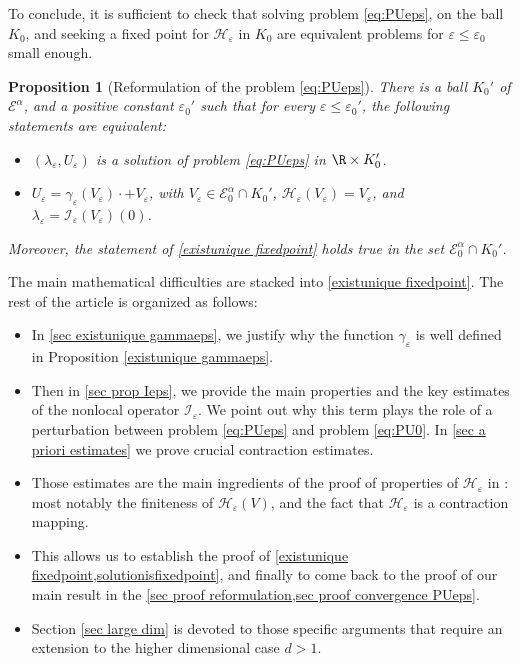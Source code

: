 \documentclass[JEP,XML,SOM,Unicode]{cedram}
\let\mathcal\mathscr
\newcommand{\cI}{\mathcal{I}}
\theoremstyle{plain}
\newtheorem{prop}[thm]{Proposition}
\theoremstyle{definition}
\renewcommand{\H}{\mathcal{H}_\eps}
\let\eps\varepsilon
\newcommand{\Ea}{\mathcal{E}^\alpha}
\newcommand{\Eaz}{\mathcal{E}^\alpha_0}
\begin{document}
To conclude, it is sufficient to check that solving problem \eqref{eq:PUeps}, on the ball $K_0$, and seeking a fixed point for $\H$ in $K_0$ are equivalent problems for $\eps\leq \eps_0$ small enough.

\begin{prop}[Reformulation of the problem \eqref{eq:PUeps}]\label{solutionisfixedpoint}
There is a ball $K_0'$ of $\Ea$, and a positive constant $\eps_0'$ such that for every $\eps\leq \eps_0'$, the following statements are equivalent:
\begin{itemize}
\item $(\lambda_\eps,U_\eps)$ is a solution of problem \eqref{eq:PUeps} in $\R \times K_0'$.

\item $U_\eps= \gamma_\eps(V_\eps) \cdot + V_\eps$, with $V_\eps \in \Eaz\cap K_0'$, $\H(V_\eps) = V_\eps$, and $\lambda_\eps = \cI_\eps(V_\eps)(0)$.
\end{itemize}
Moreover, the statement of \cref{existunique fixedpoint} holds true in the set $\Eaz\cap K_0'$.
\end{prop}

The main mathematical difficulties are stacked into \cref{existunique fixedpoint}.
The rest of the article is organized as follows:
\begin{itemize}
\item In \cref{sec existunique gammaeps}, we justify why the function $\gamma_\eps$ is well defined in Proposition \ref{existunique gammaeps}.

\item Then in \cref{sec prop Ieps}, we provide the main properties and the key estimates of the nonlocal operator $\cI_\eps$. We point out why this term plays the role of a perturbation between problem \eqref{eq:PUeps} and problem \eqref{eq:PU0}. In \cref{sec a priori estimates} we prove crucial contraction estimates.

\item Those estimates are the main ingredients of the proof of properties of $\H$ in : most notably the finiteness of $\H(V)$, and the fact that $\H$ is a contraction mapping.

\item This allows us to establish the proof of \cref{existunique fixedpoint,solutionisfixedpoint}, and finally to come back to the proof of our main result  in the \cref{sec proof reformulation,sec proof convergence PUeps}.

\item Section \ref{sec large dim} is devoted to those specific arguments that require an extension to the higher dimensional case $d>1$.
\end{itemize}
\end{document}
